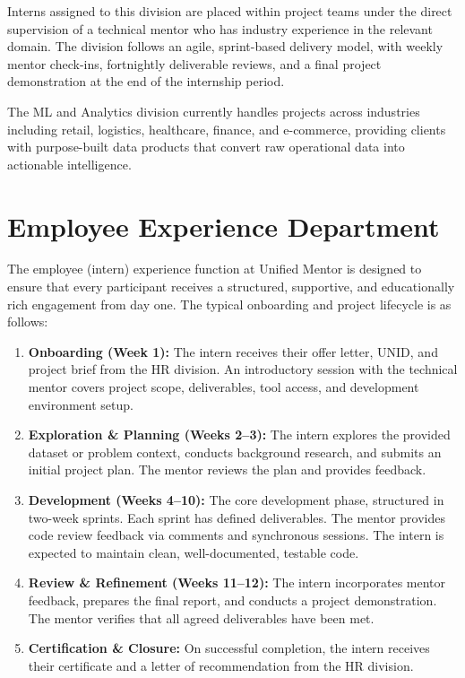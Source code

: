 \documentclass[12pt, a4paper]{report}
\begin{document}
Interns assigned to this division are placed within project teams under the
direct supervision of a technical mentor who has industry experience in the
relevant domain. The division follows an agile, sprint-based delivery model,
with weekly mentor check-ins, fortnightly deliverable reviews, and a final
project demonstration at the end of the internship period.

The ML and Analytics division currently handles projects across industries
including retail, logistics, healthcare, finance, and e-commerce, providing
clients with purpose-built data products that convert raw operational data
into actionable intelligence.

\section{Employee Experience Department}

The employee (intern) experience function at Unified Mentor is designed to
ensure that every participant receives a structured, supportive, and
educationally rich engagement from day one. The typical onboarding and
project lifecycle is as follows:

\begin{enumerate}[leftmargin=1.5em, itemsep=6pt]
  \item \textbf{Onboarding (Week 1):}
    The intern receives their offer letter, UNID, and project brief from
    the HR division. An introductory session with the technical mentor
    covers project scope, deliverables, tool access, and development
    environment setup.

  \item \textbf{Exploration \& Planning (Weeks 2--3):}
    The intern explores the provided dataset or problem context, conducts
    background research, and submits an initial project plan. The mentor
    reviews the plan and provides feedback.

  \item \textbf{Development (Weeks 4--10):}
    The core development phase, structured in two-week sprints. Each
    sprint has defined deliverables. The mentor provides code review
    feedback via comments and synchronous sessions. The intern is
    expected to maintain clean, well-documented, testable code.

  \item \textbf{Review \& Refinement (Weeks 11--12):}
    The intern incorporates mentor feedback, prepares the final report,
    and conducts a project demonstration. The mentor verifies that all
    agreed deliverables have been met.

  \item \textbf{Certification \& Closure:}
    On successful completion, the intern receives their certificate and
    a letter of recommendation from the HR division.
\end{enumerate}
\end{document}

